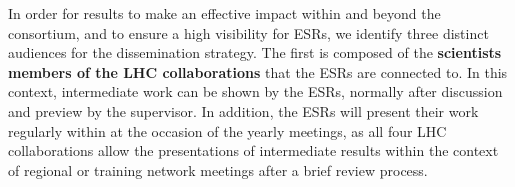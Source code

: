 


In order for \acronym results to make an effective impact within and beyond the consortium, and to ensure a high visibility for ESRs, we identify three distinct audiences for the dissemination strategy. 
The first is composed of the \textbf{scientists members of the LHC collaborations} that the ESRs are connected to. 
In this context, intermediate work can be shown by the ESRs, normally after discussion and preview by the supervisor. 
In addition, the ESRs will present their work regularly within \acronym at the occasion of the yearly meetings, as all four LHC collaborations allow the presentations of intermediate results within the context of regional or training network meetings after a brief review process. 

